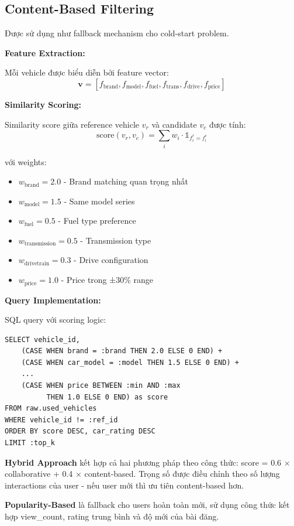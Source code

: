 \subsection{Content-Based Filtering}

Được sử dụng như fallback mechanism cho cold-start problem.

\textbf{Feature Extraction:}

Mỗi vehicle được biểu diễn bởi feature vector:
\[
\mathbf{v} = [f_{\text{brand}}, f_{\text{model}}, f_{\text{fuel}}, f_{\text{trans}}, f_{\text{drive}}, f_{\text{price}}]
\]

\textbf{Similarity Scoring:}

Similarity score giữa reference vehicle $v_r$ và candidate $v_c$ được tính:
\[
\text{score}(v_r, v_c) = \sum_{i} w_i \cdot \mathbb{1}_{f_i^r = f_i^c}
\]

với weights:
\begin{itemize}
    \item $w_{\text{brand}} = 2.0$ - Brand matching quan trọng nhất
    \item $w_{\text{model}} = 1.5$ - Same model series
    \item $w_{\text{fuel}} = 0.5$ - Fuel type preference
    \item $w_{\text{transmission}} = 0.5$ - Transmission type
    \item $w_{\text{drivetrain}} = 0.3$ - Drive configuration
    \item $w_{\text{price}} = 1.0$ - Price trong ±30\% range
\end{itemize}

\textbf{Query Implementation:}

SQL query với scoring logic:
\begin{verbatim}
SELECT vehicle_id,
    (CASE WHEN brand = :brand THEN 2.0 ELSE 0 END) +
    (CASE WHEN car_model = :model THEN 1.5 ELSE 0 END) +
    ...
    (CASE WHEN price BETWEEN :min AND :max 
          THEN 1.0 ELSE 0 END) as score
FROM raw.used_vehicles
WHERE vehicle_id != :ref_id
ORDER BY score DESC, car_rating DESC
LIMIT :top_k
\end{verbatim}

\noindent \textbf{Hybrid Approach} kết hợp cả hai phương pháp theo công thức: score = 0.6 × collaborative + 0.4 × content-based. Trọng số được điều chỉnh theo số lượng interactions của user - nếu user mới thì ưu tiên content-based hơn.

\noindent \textbf{Popularity-Based} là fallback cho users hoàn toàn mới, sử dụng công thức kết hợp view\_count, rating trung bình và độ mới của bài đăng.

